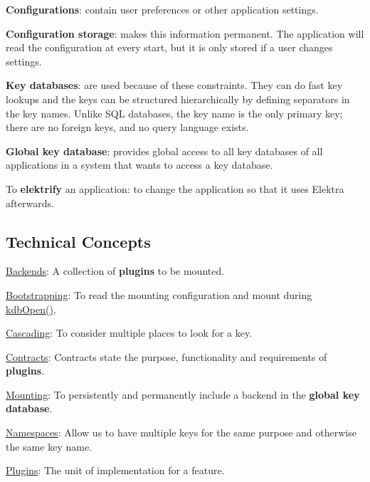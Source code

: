 
\begin{DoxyItemize}
\item {\bfseries Configurations}\+: contain user preferences or other application settings.
\item {\bfseries Configuration storage}\+: makes this information permanent. The application will read the configuration at every start, but it is only stored if a user changes settings.
\item {\bfseries Key databases}\+: are used because of these constraints. They can do fast key lookups and the keys can be structured hierarchically by defining separators in the key names. Unlike S\+Q\+L databases, the key name is the only primary key; there are no foreign keys, and no query language exists.
\item {\bfseries Global key database}\+: provides global access to all key databases of all applications in a system that wants to access a key database.
\item To {\bfseries elektrify} an application\+: to change the application so that it uses Elektra afterwards.
\end{DoxyItemize}

\subsection*{Technical Concepts}


\begin{DoxyItemize}
\item \hyperlink{md_doc_help_elektra-backends_doc_help_elektra-backends_md}{Backends}\+: A collection of {\bfseries plugins} to be mounted.
\item \hyperlink{doc_help_elektra-bootstrapping_md}{Bootstrapping}\+: To read the mounting configuration and mount during {\ttfamily \hyperlink{group__kdb_ga6808defe5870f328dd17910aacbdc6ca}{kdb\+Open()}}.
\item \hyperlink{md_doc_help_elektra-cascading_doc_help_elektra-cascading_md}{Cascading}\+: To consider multiple places to look for a key.
\item \hyperlink{md_doc_help_elektra-contracts_doc_help_elektra-contracts_md}{Contracts}\+: Contracts state the purpose, functionality and requirements of {\bfseries plugins}.
\item \hyperlink{md_doc_help_elektra-mounting_doc_help_elektra-mounting_md}{Mounting}\+: To persistently and permanently include a backend in the {\bfseries global key database}.
\item \hyperlink{md_doc_help_elektra-namespaces_doc_help_elektra-namespaces_md}{Namespaces}\+: Allow us to have multiple keys for the same purpose and otherwise the same key name.
\item \hyperlink{md_doc_help_elektra-plugins-framework_doc_help_elektra-plugins-framework_md}{Plugins}\+: The unit of implementation for a feature.
\end{DoxyItemize}


